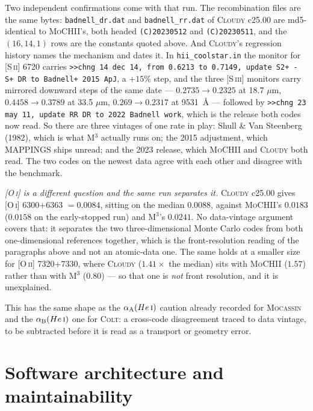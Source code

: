 \documentclass[english,a4paper]{my_memo}
\newcommand{\code}[1]{\texttt{#1}}
\newcommand{\MoCHII}{\textsc{MoCHII}}
\newcommand{\Mthree}{M$^3$}
\newcommand{\Mocassin}{\textsc{Mocassin}}
\newcommand{\Cloudy}{\textsc{Cloudy}}
\newcommand{\Colt}{\textsc{Colt}}
\newcommand{\HeI}{He\,\textsc{i}}
\begin{document}
Two independent confirmations come with that run.  The recombination files
are the same bytes: \code{badnell\_dr.dat} and \code{badnell\_rr.dat} of
\Cloudy{} c25.00 are md5-identical to \MoCHII{}'s, both headed
\code{(C)20230512} and \code{(C)20230511}, and the $(16,14,1)$ rows are the
constants quoted above.  And \Cloudy{}'s regression history names the
mechanism and dates it.  In \code{hii\_coolstar.in} the monitor for
[S\,\textsc{ii}] 6720 carries
\code{>>chng 14 dec 14, from 0.6213 to 0.7149, update S2+ - S+ DR to
Badnell+ 2015 ApJ}, a $+15\%$ step, and the three [S\,\textsc{iii}]
monitors carry mirrored downward steps of the same date --- $0.2735
\rightarrow 0.2325$ at 18.7 $\mu$m, $0.4458 \rightarrow 0.3789$ at
33.5 $\mu$m, $0.269 \rightarrow 0.2317$ at 9531~\AA{} --- followed by
\code{>>chng 23 may 11, update RR DR to 2022 Badnell work}, which is the
release both codes now read.  So there are three vintages of one rate in
play: Shull \& Van Steenberg (1982), which is what \Mthree{} actually runs
on; the 2015 adjustment, which MAPPINGS ships unread; and the 2023 release,
which \MoCHII{} and \Cloudy{} both read.  The two codes on the newest data
agree with each other and disagree with the benchmark.

\emph{[O\,\textsc{i}] is a different question and the same run separates
it.}  \Cloudy{} c25.00 gives [O\,\textsc{i}] 6300+6363 $= 0.0084$, sitting
on the median $0.0088$, against \MoCHII{}'s $0.0183$ ($0.0158$ on the
early-stopped run) and \Mthree{}'s $0.0241$.  No data-vintage argument covers that: it separates the two
three-dimensional Monte Carlo codes from both one-dimensional references
together, which is the front-resolution reading of the paragraphs above and
not an atomic-data one.  The same holds at a smaller size for
[O\,\textsc{ii}] 7320+7330, where \Cloudy{} ($1.41\times$ the median) sits
with \MoCHII{} ($1.57$) rather than with \Mthree{} ($0.80$) --- so that one
is \emph{not} front resolution, and it is unexplained.

This has the same shape as the $\alpha_{\rm A}(\HeI{})$ caution already
recorded for \Mocassin{} and the $\alpha_{\rm B}(\HeI{})$ one for \Colt{}:
a cross-code disagreement traced to data vintage, to be subtracted before it
is read as a transport or geometry error.

\section{Software architecture and maintainability}
\end{document}
